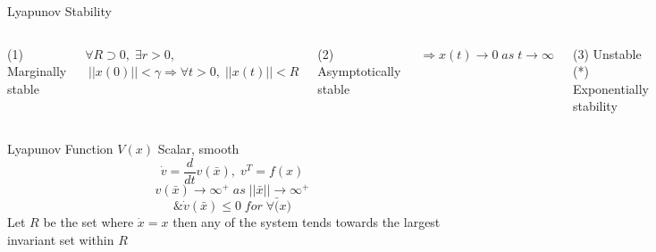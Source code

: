 \documentclass{beamer}
\begin{document}
\begin{frame}{Lyapunov Stability}
    \begin{columns}[T]
    (1) Marginally stable\\
    \vspace{-0.5cm}\begin{center}
    $\forall R\supset 0,\; \exists r>0$,\\
    $\; ||x(0)||<\gamma \Rightarrow \forall t>0,\;||x(t)||<R$\\
    \end{center}
    (2) Asymptotically stable\\
    \vspace{-0.5cm}\begin{center}
    $\Rightarrow x(t)\rightarrow 0 \; as\; t\rightarrow \infty$\\
    \end{center}
    (3) Unstable\\
    \vspace{0.5cm}
    (*) Exponentially stability\\
    \vspace{-0.5cm}\begin{center}
    $||x(0)|| \in B_r \; s,t \; \forall t>0$,\\
    $||x(t)||\leq x||x(0)||e^{-\lambda t}$
    \end{center}
        \includegraphics[width=\textwidth]{fig/lyapunovStability.png}   
    \end{columns}
\end{frame}

\begin{frame}{Lyapunov Function}
$V(x)$ Scalar, smooth\\
$$\dot{v} = \frac{d}{dt}v(\bar{x}),\; v^T = f(x)$$
$$v(\bar{x})\rightarrow {\infty}^+ \; as\; ||\bar{x}|| \rightarrow {\infty}^+$$
$$\& \dot{v}(\bar{x}) \leq 0 \; for \; \forall \bar(x)$$
Let $R$ be the set where $\dot{x}=x$ then any of the system tends towards the largest invariant set within $R$ 
\end{frame}
\end{document}
